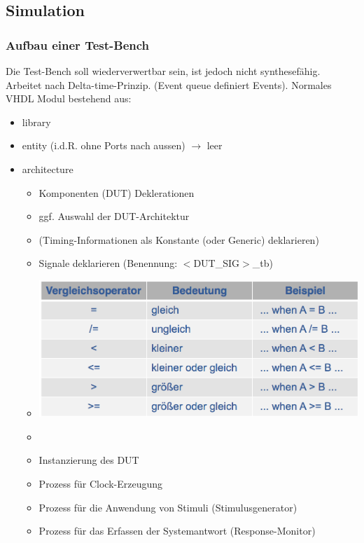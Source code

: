 \begin{multicols}{2}
	\subsection{Simulation}
	\subsubsection{Aufbau einer Test-Bench}
	Die Test-Bench soll wiederverwertbar sein, ist jedoch nicht synthesefähig. Arbeitet nach Delta-time-Prinzip. (Event queue definiert Events). Normales VHDL Modul bestehend aus:
	\begin{itemize}
	\itemsep0em
		\item library
		\item entity (i.d.R. ohne Ports nach aussen) $\rightarrow$ leer
		\item architecture
		\begin{itemize}
			\itemsep0em
			\item Komponenten (DUT) Deklerationen
			\item ggf. Auswahl der DUT-Architektur
			\item (Timing-Informationen als Konstante (oder 
				Generic) deklarieren)
			\item Signale deklarieren (Benennung: $<$DUT\_SIG$>$\_tb)
			\item[\-] %
				\begin{minipage}{\linewidth}
					\includegraphics[width=\linewidth]{pics/arithvergleich}
				\end{minipage}
			\item[\-]
			\item Instanzierung des DUT
			\item Prozess für Clock-Erzeugung
			\item Prozess für die Anwendung von Stimuli 
				(Stimulusgenerator)
			\item Prozess für das Erfassen der Systemantwort 
				(Response-Monitor)
		\end{itemize}
	\end{itemize}
\end{multicols}

